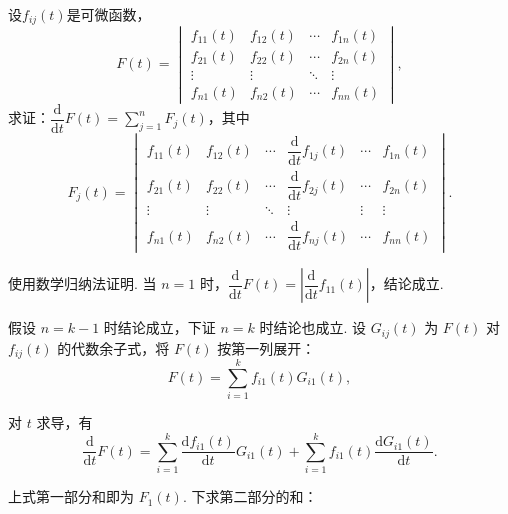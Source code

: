 \begin{exercise}
\begin{exgroup}
        \item 设$f_{ij}(t)$是可微函数，
        \[F(t)=\begin{vmatrix}
                f_{11}(t) & f_{12}(t) & \cdots & f_{1n}(t) \\
                f_{21}(t) & f_{22}(t) & \cdots & f_{2n}(t) \\
                \vdots    & \vdots    & \ddots & \vdots    \\
                f_{n1}(t) & f_{n2}(t) & \cdots & f_{nn}(t)
            \end{vmatrix},\]
        求证：$\dfrac{\mathrm{d}}{\mathrm{d}t}F(t)=\sum\limits_{j=1}^nF_j(t)$，其中
        \[F_j(t)=\begin{vmatrix}
                f_{11}(t) & f_{12}(t) & \cdots & \dfrac{\mathrm{d}}{\mathrm{d}t}f_{1j}(t) & \cdots & f_{1n}(t) \\[2ex]
                f_{21}(t) & f_{22}(t) & \cdots & \dfrac{\mathrm{d}}{\mathrm{d}t}f_{2j}(t) & \cdots & f_{2n}(t) \\[2ex]
                \vdots    & \vdots    & \ddots & \vdots                                   & \vdots & \vdots    \\[2ex]
                f_{n1}(t) & f_{n2}(t) & \cdots & \dfrac{\mathrm{d}}{\mathrm{d}t}f_{nj}(t) & \cdots & f_{nn}(t)
            \end{vmatrix}.\]
        \begin{answer}
            使用数学归纳法证明. 当 $n=1$ 时，$\dfrac{\mathrm{d}}{\mathrm{d}t}F(t) = \left\lvert \dfrac{\mathrm{d}}{\mathrm{d}t}f_{11}(t) \right\rvert$，结论成立.

            假设 $n=k-1$ 时结论成立，下证 $n=k$ 时结论也成立. 设 $G_{ij}(t)$ 为 $F(t)$ 对 $f_{ij}(t)$ 的代数余子式，将 $F(t)$ 按第一列展开：
            \[
                F(t) = \sum_{i=1}^k f_{i1}(t) G_{i1}(t),
            \]

            对 $t$ 求导，有
            \[
                \dfrac{\mathrm{d}}{\mathrm{d}t}F(t) = \sum_{i=1}^k \dfrac{\mathrm{d}f_{i1}(t)}{\mathrm{d}t} G_{i1}(t) + \sum_{i=1}^k f_{i1}(t) \dfrac{\mathrm{d}G_{i1}(t)}{\mathrm{d}t}.
            \]

            上式第一部分和即为 $F_1(t)$. 下求第二部分的和：


\end{answer}
\end{exgroup}
\end{exercise}
